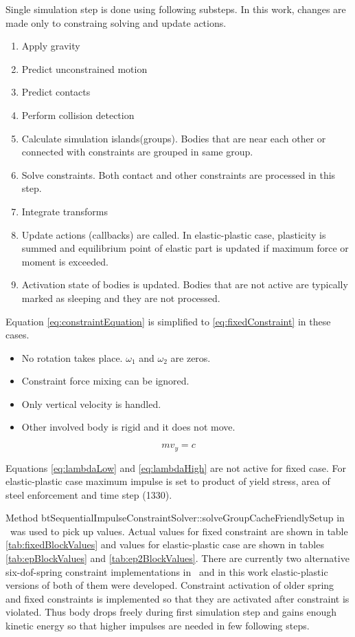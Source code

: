 Single simulation step is done using following substeps. 
In this work, changes are made only to constraing solving and update actions.
\begin{enumerate}
\item Apply gravity
\item Predict unconstrained motion
\item Predict contacts
\item Perform collision detection
\item Calculate simulation islands(groups). Bodies that are near each other or connected with constraints are grouped in same group.
\item Solve constraints. Both contact and other constraints are processed in this step.
\item Integrate transforms
\item Update actions (callbacks) are called. 
In elastic-plastic case, plasticity is summed and equilibrium point of elastic part is updated if maximum force or moment is exceeded.
\item Activation state of bodies is updated. Bodies that are not active
 are typically marked as sleeping and they are not processed.
\end{enumerate} 

Equation \ref{eq:constraintEquation} is simplified
to \ref{eq:fixedConstraint} in these cases.
\begin{itemize}
\item No rotation takes place. $\omega_1$ and $\omega_2$ are zeros.
\item Constraint force mixing can be ignored.
\item Only vertical velocity is handled.
\item Other involved body is rigid and it does not move.
\end{itemize} 

\begin{equation} \label{eq:fixedConstraint}
m v_y = c 
\end{equation}

Equations \ref{eq:lambdaLow} and \ref{eq:lambdaHigh} are not active for fixed case.
For elastic-plastic case maximum impulse is set to product of yield stress, area of steel enforcement and time step (1330).

Method btSequentialImpulseConstraintSolver::solveGroupCacheFriendlySetup
in \bullet\ was used to pick up values. Actual values for fixed constraint are shown in table
\ref{tab:fixedBlockValues} and values for elastic-plastic case are shown in tables \ref{tab:epBlockValues} and 
 \ref{tab:ep2BlockValues}. There are currently two alternative six-dof-spring constraint implementations in \bullet\ and 
in this work elastic-plastic versions of both of them were developed. 
Constraint activation of older spring and fixed constraints is implemented so that 
they are activated after constraint is violated.
Thus body drops freely during first simulation step and 
gains enough kinetic energy so that higher impulses are needed in few following steps.

